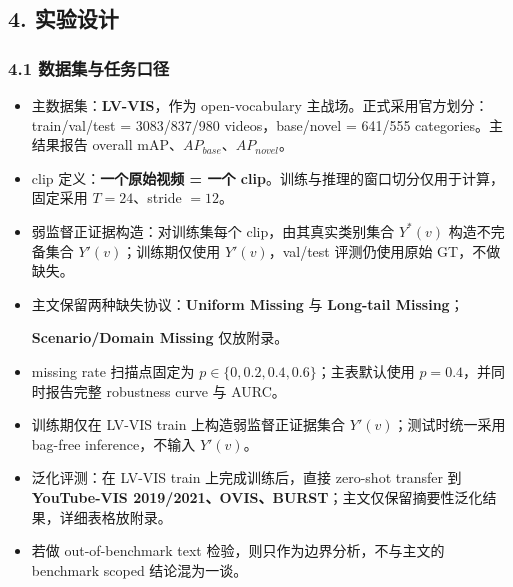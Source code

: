 \documentclass[UTF8]{ctexart}
\begin{document}
\par\noindent\hrulefill\par

\subsection*{4. 实验设计}

\subsubsection*{4.1 数据集与任务口径}
\begin{itemize}
\item 主数据集：\textbf{LV-VIS}，作为 open-vocabulary 主战场。正式采用官方划分：train/val/test = 3083/837/980 videos，base/novel = 641/555 categories。主结果报告 overall mAP、$AP_{base}$、$AP_{novel}$。
\item clip 定义：\textbf{一个原始视频 = 一个 clip}。训练与推理的窗口切分仅用于计算，固定采用 $T=24$、stride $=12$。
\item 弱监督正证据构造：对训练集每个 clip，由其真实类别集合 $Y^*(v)$ 构造不完备集合 $Y'(v)$；训练期仅使用 $Y'(v)$，val/test 评测仍使用原始 GT，不做缺失。
\item 主文保留两种缺失协议：\textbf{Uniform Missing} 与 \textbf{Long-tail Missing}；\par\hspace*{1.6em}\textbf{Scenario/Domain Missing} 仅放附录。
\item missing rate 扫描点固定为 \textbf{$p\in\{0,0.2,0.4,0.6\}$}；主表默认使用 \textbf{$p=0.4$}，并同时报告完整 robustness curve 与 AURC。
\item 训练期仅在 LV-VIS train 上构造弱监督正证据集合 $Y'(v)$；测试时统一采用 bag-free inference，不输入 $Y'(v)$。
\item 泛化评测：在 LV-VIS train 上完成训练后，直接 zero-shot transfer 到 \textbf{YouTube-VIS 2019/2021、OVIS、BURST}；主文仅保留摘要性泛化结果，详细表格放附录。
\item 若做 out-of-benchmark text 检验，则只作为边界分析，不与主文的 benchmark scoped 结论混为一谈。
\end{itemize}
\end{document}
